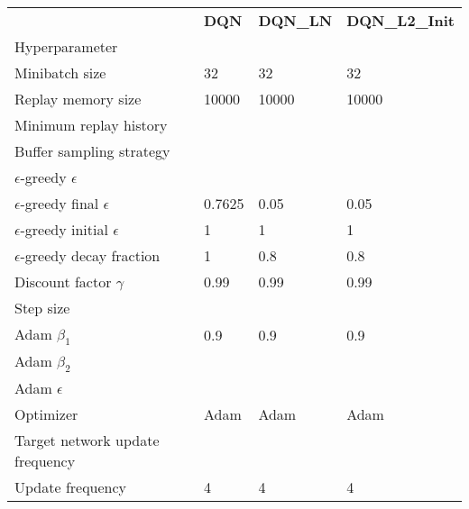\begin{tabular}{llll}
 & \bfseries DQN & \bfseries DQN_LN & \bfseries DQN_L2_Init \\
Hyperparameter &  &  &  \\
Minibatch size & 32 & 32 & 32 \\
Replay memory size & 10000 & 10000 & 10000 \\
Minimum replay history &  &  &  \\
Buffer sampling strategy &  &  &  \\
$\epsilon$-greedy $\epsilon$ &  &  &  \\
$\epsilon$-greedy final $\epsilon$ & 0.7625 & 0.05 & 0.05 \\
$\epsilon$-greedy initial $\epsilon$ & 1 & 1 & 1 \\
$\epsilon$-greedy decay fraction & 1 & 0.8 & 0.8 \\
Discount factor $\gamma$ & 0.99 & 0.99 & 0.99 \\
Step size &  &  &  \\
Adam $\beta_1$ & 0.9 & 0.9 & 0.9 \\
Adam $\beta_2$ &  &  &  \\
Adam $\epsilon$ &  &  &  \\
Optimizer & Adam & Adam & Adam \\
Target network update frequency &  &  &  \\
Update frequency & 4 & 4 & 4 \\
\end{tabular}
